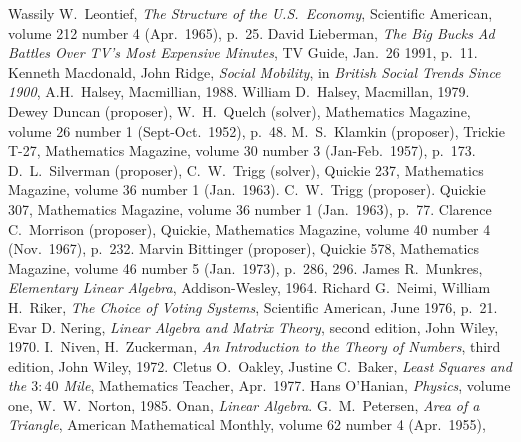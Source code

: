 \begin{thebibliography}{\makebox[2em][c]{{}\hfil{}}}
  Wassily W.\ Leontief,
  \emph{The Structure of the U.S.\ Economy},
  Scientific American,
  volume 212 number 4 (Apr.\ 1965),
  p.~25. 
  David Lieberman,
  \emph{The Big Bucks Ad Battles Over TV's Most Expensive Minutes},
  TV Guide,
  Jan.\ 26 1991,
  p.~11.
  Kenneth Macdonald, John Ridge,
  \emph{Social Mobility},
  in \emph{British Social Trends Since 1900},
  A.H.~Halsey,
  Macmillian, 1988.
  William D.~Halsey,
  Macmillan, 1979.
  Dewey Duncan (proposer), W.\ H.\ Quelch (solver),
  Mathematics Magazine,
  volume 26 number 1 (Sept-Oct.\ 1952),
  p.~48.
  M.\ S.\ Klamkin (proposer),
  Trickie T-27,
  Mathematics Magazine,
  volume 30 number 3 (Jan-Feb.\ 1957),
  p.~173.
  D.\ L.\ Silverman (proposer), C.\ W.\ Trigg (solver),
  Quickie 237,
  Mathematics Magazine,
  volume 36 number 1 (Jan.\ 1963).
  C.\ W.\ Trigg (proposer).
  Quickie 307,
  Mathematics Magazine,
  volume 36 number 1 (Jan.\ 1963),
  p.~77.
  Clarence C.\ Morrison (proposer),
  Quickie,
  Mathematics Magazine,
  volume 40 number 4 (Nov.\ 1967),
  p.~232.
  Marvin Bittinger (proposer),
  Quickie 578,
  Mathematics Magazine,
  volume 46 number 5 (Jan.\ 1973),
  p.~286, 296.
  James R.\ Munkres,
  \emph{Elementary Linear Algebra},
  Addison-Wesley,
  1964.
  Richard G.~Neimi, William H.~Riker,
  \emph{The Choice of Voting Systems},
  Scientific American,
  June 1976,
  p.~21.
  Evar D. Nering,
  \emph{Linear Algebra and Matrix Theory},
  second edition,
  John Wiley,
  1970.
  I.\ Niven, H.\ Zuckerman,
  \emph{An Introduction to the Theory of Numbers},
  third edition,
  John Wiley,
  1972.
  Cletus O.\ Oakley, Justine C.\ Baker,
  \emph{Least Squares and the $3:40$ Mile},
  Mathematics Teacher,
  Apr.\ 1977.
  Hans O'Hanian,
  \emph{Physics},
  volume one,
  W.\ W.\ Norton,
  1985.
  Onan,
  \emph{Linear Algebra}.
  G.\ M.\ Petersen,
  \emph{Area of a Triangle},
  American Mathematical Monthly,
  volume 62 number 4 (Apr.\ 1955),

\end{thebibliography}

